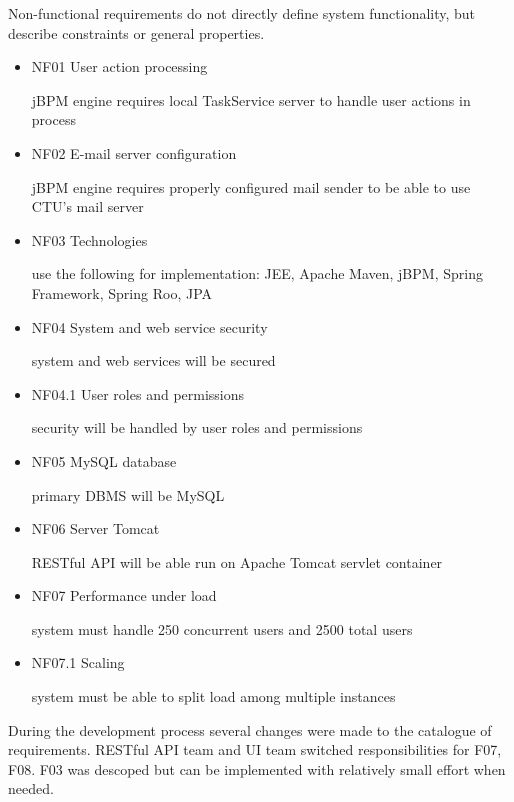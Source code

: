 	Non-functional requirements do not directly define system functionality, but describe constraints or general
	properties.
	
	\begin{itemize}
		\item NF01 User action processing
	
		jBPM engine requires local TaskService server to handle user actions in process
		
		\item NF02 E-mail server configuration

		jBPM engine requires properly configured mail sender to be able to use CTU's mail server
		
		\item NF03 Technologies
		\label{NF03}
		
		use the following for implementation: JEE, Apache Maven, jBPM, Spring Framework, Spring Roo, JPA
		
		\item NF04 System and web service security
		
		system and web services will be secured
		
		\item NF04.1 User roles and permissions
		
		security will be handled by user roles and permissions
		
		\item NF05 MySQL database
		
		primary DBMS will be MySQL
		
		\item NF06 Server Tomcat
		
		RESTful API will be able run on Apache Tomcat servlet container
		
		\item NF07 Performance under load
		
		system must handle 250 concurrent users and 2500 total users
		
		\item NF07.1 Scaling
		
		system must be able to split load among multiple instances
	\end{itemize}
	
	During the development process several changes were made to the catalogue of requirements. RESTful API team and UI team
	switched responsibilities for  F07, F08. F03 was descoped but can be implemented with relatively small effort when
	needed.
	

